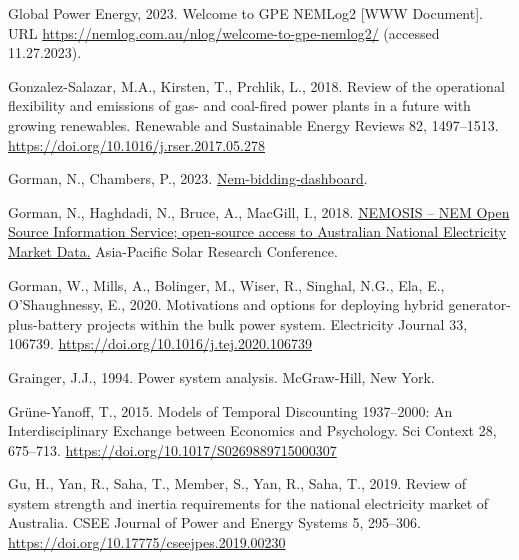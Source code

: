 \documentclass[12pt,a4paper,]{report}
\newlength{\cslhangindent}
\newenvironment{CSLReferences}[2] %
 {%
  \setlength{\parindent}{0pt}
  \ifodd #1 \everypar{\setlength{\hangindent}{\cslhangindent}}\ignorespaces\fi
  \ifnum #2 > 0
  \setlength{\parskip}{#2\baselineskip}
  \fi
 }%
 {}
\begin{document}
\begin{CSLReferences}{1}{0}
\leavevmode{}%
Global Power Energy, 2023. Welcome to {GPE NEMLog2} {[}WWW Document{]}.
URL \url{https://nemlog.com.au/nlog/welcome-to-gpe-nemlog2/} (accessed
11.27.2023).

\leavevmode{}%
Gonzalez-Salazar, M.A., Kirsten, T., Prchlik, L., 2018. Review of the
operational flexibility and emissions of gas- and coal-fired power
plants in a future with growing renewables. Renewable and Sustainable
Energy Reviews 82, 1497--1513.
\url{https://doi.org/10.1016/j.rser.2017.05.278}

\leavevmode{}%
Gorman, N., Chambers, P., 2023.
\href{https://github.com/UNSW-CEEM/nem-bidding-dashboard}{Nem-bidding-dashboard}.

\leavevmode{}%
Gorman, N., Haghdadi, N., Bruce, A., MacGill, I., 2018.
\href{https://www.researchgate.net/publication/329798805}{{NEMOSIS} --
{NEM Open Source Information Service}; open-source access to {Australian
National Electricity Market Data}.} Asia-Pacific Solar Research
Conference.

\leavevmode{}%
Gorman, W., Mills, A., Bolinger, M., Wiser, R., Singhal, N.G., Ela, E.,
O'Shaughnessy, E., 2020. Motivations and options for deploying hybrid
generator-plus-battery projects within the bulk power system.
Electricity Journal 33, 106739.
\url{https://doi.org/10.1016/j.tej.2020.106739}

\leavevmode{}%
Grainger, J.J., 1994. Power system analysis. McGraw-Hill, New York.

\leavevmode{}%
Grüne-Yanoff, T., 2015. Models of {Temporal Discounting} 1937--2000: {An
Interdisciplinary Exchange} between {Economics} and {Psychology}. Sci
Context 28, 675--713. \url{https://doi.org/10.1017/S0269889715000307}

\leavevmode{}%
Gu, H., Yan, R., Saha, T., Member, S., Yan, R., Saha, T., 2019. Review
of system strength and inertia requirements for the national electricity
market of {Australia}. CSEE Journal of Power and Energy Systems 5,
295--306. \url{https://doi.org/10.17775/cseejpes.2019.00230}


\end{CSLReferences}
\end{document}
